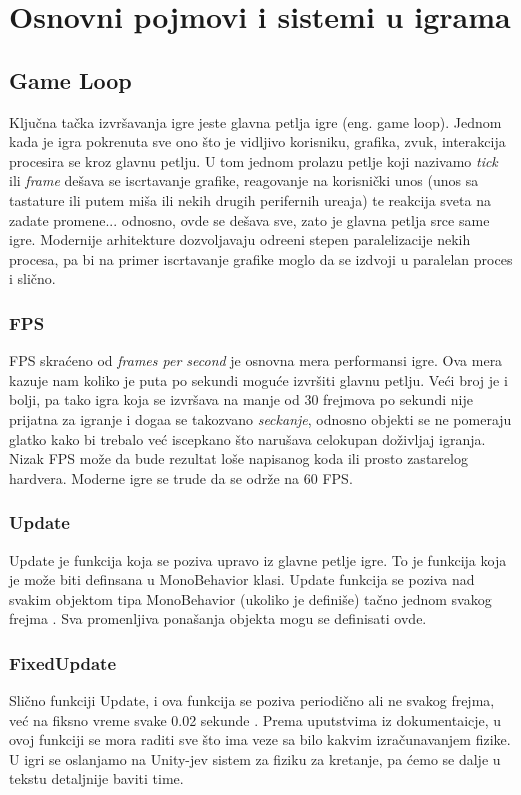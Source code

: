 \clearpage
\section{Osnovni pojmovi i sistemi u igrama}
\label{sec:Section_Name}

\subsection{Game Loop}
Klju\v{c}na ta\v{c}ka izvr\v{s}avanja igre jeste glavna petlja igre (eng. game loop).
Jednom kada je igra pokrenuta sve ono \v{s}to je vidljivo korisniku, grafika, 
zvuk, interakcija procesira se kroz glavnu petlju. U tom jednom prolazu petlje koji
nazivamo \emph{tick} ili \emph{frame} de\v{s}ava se iscrtavanje grafike, reagovanje na 
korisni\v{c}ki unos (unos sa tastature ili putem mi\v{s}a ili nekih drugih perifernih ure\dj aja) 
te reakcija sveta na zadate promene... odnosno, ovde se de\v{s}ava sve, zato je glavna 
petlja srce same igre. Modernije arhitekture dozvoljavaju odre\dj eni stepen paralelizacije
nekih procesa, pa bi na primer iscrtavanje grafike moglo da se izdvoji u paralelan proces i sli\v{c}no.

\subsubsection{FPS}
FPS skra\'ceno od \emph{frames per second} je osnovna mera performansi igre. Ova mera kazuje nam
koliko je puta po sekundi mogu\'ce izvr\v{s}iti glavnu petlju. Ve\'ci broj je i bolji, pa tako igra
koja se izvr\v{s}ava na manje od 30 frejmova po sekundi nije prijatna za igranje
i doga\dj a se takozvano \emph{seckanje}, odnosno objekti se ne pomeraju glatko kako bi trebalo
ve\'c iscepkano \v{s}to naru\v{s}ava celokupan do\v{z}ivljaj igranja. Nizak FPS mo\v{z}e
da bude rezultat lo\v{s}e napisanog koda ili prosto zastarelog hardvera. Moderne igre se trude da 
se odr\v{z}e na 60 FPS.

\subsubsection{Update}
Update je funkcija koja se poziva upravo iz glavne petlje igre. To je funkcija koja je mo\v{z}e biti
definsana u MonoBehavior klasi. Update funkcija se poziva nad svakim objektom tipa MonoBehavior (ukoliko
je defini\v{s}e) ta\v{c}no jednom svakog frejma \cite{unitydocs}. Sva promenljiva pona\v{s}anja objekta
mogu se definisati ovde.

\subsubsection{FixedUpdate}
Sli\v{c}no funkciji Update, i ova funkcija se poziva periodi\v{c}no ali ne svakog frejma, ve\'c 
na fiksno vreme svake 0.02 sekunde \cite{unitydocs}. Prema uputstvima iz dokumentaicje,
u ovoj funkciji se mora raditi sve \v{s}to ima veze sa bilo kakvim izra\v{c}unavanjem fizike. U igri
se oslanjamo na Unity-jev sistem za fiziku za kretanje, pa \'cemo se dalje u tekstu detaljnije
baviti time.

